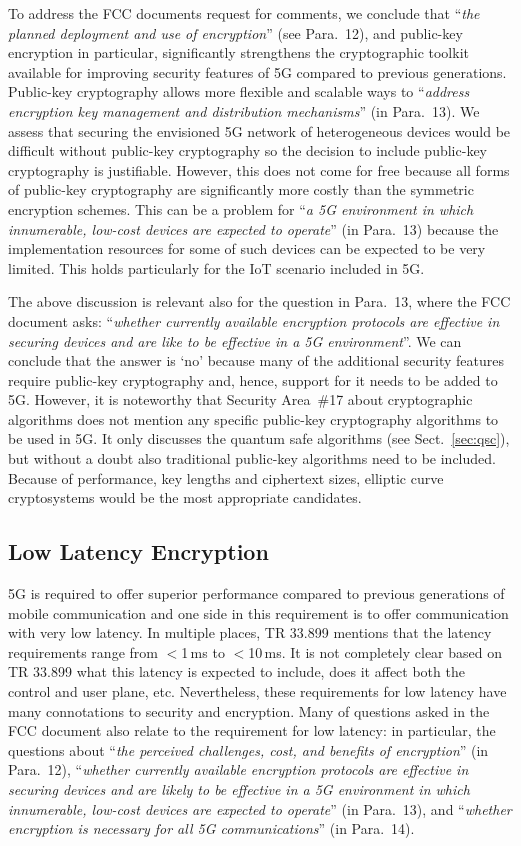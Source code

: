 \documentclass[12pt]{llncs}
\newcommand\ques[1]{``\emph{#1}''}
\begin{document}
To address the FCC documents request for comments, we conclude that \ques{the planned deployment and use of encryption} (see Para.~12), and public-key encryption in particular, significantly strengthens the cryptographic toolkit available for improving security features of 5G compared to previous generations. Public-key cryptography allows more flexible and scalable ways to \ques{address encryption key management and distribution mechanisms} (in Para.~13). We assess that securing the envisioned 5G network of heterogeneous devices would be difficult without public-key cryptography so the decision to include public-key cryptography is justifiable. However, this does not come for free because all forms of public-key cryptography are significantly more costly than the symmetric encryption schemes. This can be a problem for \ques{a 5G environment in which innumerable, low-cost devices are expected to operate} (in Para.~13) because the implementation resources for some of such devices can be expected to be very limited. This holds particularly for the IoT scenario included in 5G.

The above discussion is relevant also for the question in Para.~13, where the FCC document asks: \ques{whether currently available encryption protocols are effective in securing devices and are like to be effective in a 5G environment}. We can conclude that the answer  is `no' because many of the additional security features require public-key cryptography and, hence, support for it needs to be added to 5G. However, it is noteworthy that Security Area~\#17 about cryptographic algorithms does not mention any specific public-key cryptography algorithms to be used in 5G. It only discusses the quantum safe algorithms (see Sect.~\ref{sec:qsc}), but without a doubt also traditional public-key algorithms need to be included. Because of performance, key lengths and ciphertext sizes, elliptic curve cryptosystems would be the most appropriate candidates.

\subsection{Low Latency Encryption}
\label{sec:latency}

5G is required to offer superior performance compared to previous generations of mobile communication and one side in this requirement is to offer communication with very low latency. In multiple places, TR 33.899 mentions that the latency requirements range from $<$1\,ms to $<$10\,ms. It is not completely clear based on TR 33.899 what this latency is expected to include, does it affect both the control and user plane, etc. Nevertheless, these requirements for low latency have many connotations to security and encryption. Many of questions asked in the FCC document also relate to the requirement for low latency: in particular, the questions about \ques{the perceived challenges, cost, and benefits of encryption} (in Para.~12), \ques{whether currently available encryption protocols are effective in securing devices and are likely to be effective in a 5G environment in which innumerable, low-cost devices are expected to operate} (in Para.~13), and \ques{whether encryption is necessary for all 5G communications} (in Para.~14). 
\end{document}

